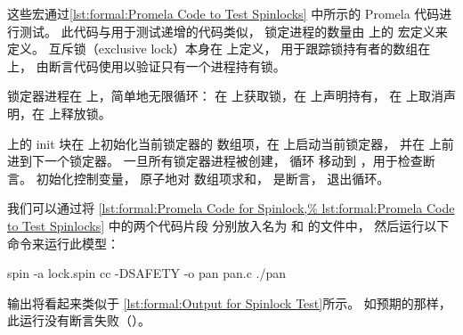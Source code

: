 \begin{listing}

\caption{测试自旋锁的 Promela 代码}
\label{lst:formal:Promela Code to Test Spinlocks}
\end{listing}

\begin{fcvref}
这些宏通过\cref{lst:formal:Promela Code to Test Spinlocks}
中所示的 Promela 代码进行测试。
此代码与用于测试递增的代码类似，
锁定进程的数量由  上的
 宏定义来定义。
互斥锁（exclusive lock）本身在  上定义，
用于跟踪锁持有者的数组在  上，
 由断言代码使用以验证只有一个进程持有锁。
\end{fcvref}

\begin{fcvref}
锁定器进程在  上，简单地无限循环：
在  上获取锁，在  上声明持有，
在  上取消声明，在  上释放锁。
\end{fcvref}

\begin{fcvref}
 上的 init 块在  上初始化当前锁定器的
 数组项，在  上启动当前锁定器，
并在  上前进到下一个锁定器。
一旦所有锁定器进程被创建， 循环
移动到 ，用于检查断言。
 初始化控制变量，
 原子地对  数组项求和，
 是断言， 退出循环。
\end{fcvref}

我们可以通过将
\cref{lst:formal:Promela Code for Spinlock,%
lst:formal:Promela Code to Test Spinlocks} 中的两个代码片段
分别放入名为  和  的文件中，
然后运行以下命令来运行此模型：

\begin{VerbatimU}
spin -a lock.spin
cc -DSAFETY -o pan pan.c
./pan
\end{VerbatimU}

\begin{listing}
\vspace*{-9pt}
\caption{自旋锁测试的输出}
\label{lst:formal:Output for Spinlock Test}
\end{listing}

输出将看起来类似于
\cref{lst:formal:Output for Spinlock Test}所示。
如预期的那样，此运行没有断言失败（）。

